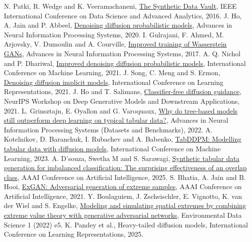 \documentclass[12pt,a4paper]{report}
\newcommand{\reflink}[2]{\href{#1}{\textcolor{linkblue}{#2}}}
\begin{document}
{\begin{thebibliography}{99}
 N. Patki, R. Wedge and K. Veeramachaneni, \reflink{https://doi.org/10.1109/DSAA.2016.49}{The Synthetic Data Vault}, IEEE International Conference on Data Science and Advanced Analytics, 2016.
 J. Ho, A. Jain and P. Abbeel, \reflink{https://arxiv.org/abs/2006.11239}{Denoising diffusion probabilistic models}, Advances in Neural Information Processing Systems, 2020.
 I. Gulrajani, F. Ahmed, M. Arjovsky, V. Dumoulin and A. Courville, \reflink{https://arxiv.org/abs/1704.00028}{Improved training of Wasserstein GANs}, Advances in Neural Information Processing Systems, 2017.
 A. Q. Nichol and P. Dhariwal, \reflink{https://arxiv.org/abs/2102.09672}{Improved denoising diffusion probabilistic models}, International Conference on Machine Learning, 2021.
 J. Song, C. Meng and S. Ermon, \reflink{https://arxiv.org/abs/2010.02502}{Denoising diffusion implicit models}, International Conference on Learning Representations, 2021.
 J. Ho and T. Salimans, \reflink{https://arxiv.org/abs/2207.12598}{Classifier-free diffusion guidance}, NeurIPS Workshop on Deep Generative Models and Downstream Applications, 2021.
 L. Grinsztajn, E. Oyallon and G. Varoquaux, \reflink{https://arxiv.org/abs/2207.08815}{Why do tree-based models still outperform deep learning on typical tabular data?}, Advances in Neural Information Processing Systems (Datasets and Benchmarks), 2022.
 A. Kotelnikov, D. Baranchuk, I. Rubachev and A. Babenko, \reflink{https://arxiv.org/abs/2209.15421}{TabDDPM: Modelling tabular data with diffusion models}, International Conference on Machine Learning, 2023.
 A. D'souza, Swetha M and S. Sarawagi, \reflink{https://arxiv.org/abs/2412.15657}{Synthetic tabular data generation for imbalanced classification: The surprising effectiveness of an overlap class}, AAAI Conference on Artificial Intelligence, 2025.
 S. Bhatia, A. Jain and B. Hooi, \reflink{https://arxiv.org/abs/2009.08454}{ExGAN: Adversarial generation of extreme samples}, AAAI Conference on Artificial Intelligence, 2021.
 Y. Boulaguiem, J. Zscheischler, E. Vignotto, K. van der Wiel and S. Engelke, \reflink{https://arxiv.org/abs/2111.00267}{Modeling and simulating spatial extremes by combining extreme value theory with generative adversarial networks}, Environmental Data Science 1 (2022) e5.
 K. Pandey et al., Heavy-tailed diffusion models, International Conference on Learning Representations, 2025.

\end{thebibliography}}
\end{document}
